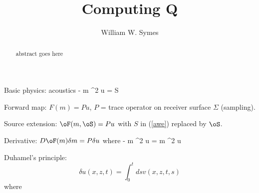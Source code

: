 \title{Computing Q}
\author{William W. Symes}

\begin{abstract}
abstract goes here
\end{abstract}

Basic physics: acoustics
\be
\label{awe}
 - m \nabla^2 u = S
\ee

Forward map: $F(m) = Pu$, $P$ = trace operator on receiver surface $\Sigma$ (sampling).

Source extension: $\oF(m,\oS) = Pu$ with $S$ in (\ref{awe}) replaced by $\oS$.


Derivative: $D\oF(m)\delta m = P \delta u$ where
\be
\label{dawe}
 - m \nabla^2 \delta u = \delta m \nabla^2 u
\ee

Duhamel's principle:
\[
\delta u(x,z,t) = \int_0^t ds v(x,z,t,s)
\]
where
